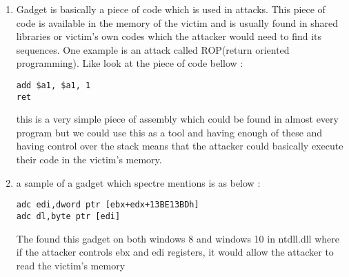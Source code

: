 \begin{enumerate}
    

    \item Gadget is basically a piece of code which is used in attacks. This piece of code is available in the memory of the victim and is usually found in shared libraries or victim's own codes which the attacker would need to find its sequences. One example is an attack called ROP(return oriented programming). Like look at the piece of code bellow : 
\begin{lstlisting}
add $a1, $a1, 1 
ret
\end{lstlisting}
this is a very simple piece of assembly which could be found in almost every program but we could use this as a tool and having enough of these and 
having control over the stack means that the attacker could basically execute their code in the victim's memory.

\item a sample of a gadget which spectre mentions is as below : 
\begin{lstlisting}
adc edi,dword ptr [ebx+edx+13BE13BDh]
adc dl,byte ptr [edi]    
\end{lstlisting}
The found this gadget on both windows 8 and windows 10 in ntdll.dll where if the attacker controls ebx and edi registers, 
it would allow the attacker to read the victim's memory
\end{enumerate}